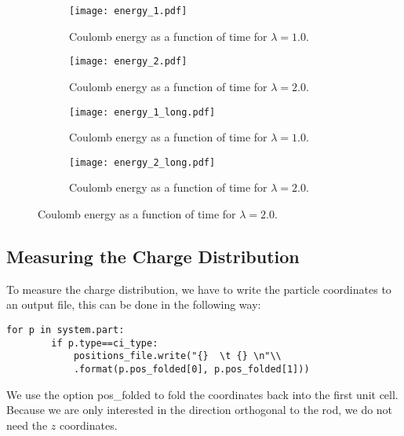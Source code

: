 \documentclass[a4paper,10pt,bibtotoc]{scrartcl}
\begin{document}
\begin{figure}[ht]
\begin{subfigure}{.5\textwidth}
  \centering
  \texttt{[image: energy\_1.pdf]}  
  \caption{Coulomb energy as a function of time for $\lambda=1.0$.}
  \label{equi1}
\end{subfigure}
\begin{subfigure}{.5\textwidth}
  \centering
  \texttt{[image: energy\_2.pdf]}  
  \caption{Coulomb energy as a function of time for $\lambda=2.0$.}
  \label{equi2}
\end{subfigure}
\begin{subfigure}{.5\textwidth}
  \centering
  \texttt{[image: energy\_1\_long.pdf]}  
  \caption{Coulomb energy as a function of time for $\lambda=1.0$.}
  \label{equi3}
\end{subfigure}
\begin{subfigure}{.5\textwidth}
  \centering
  \texttt{[image: energy\_2\_long.pdf]}  
  \caption{Coulomb energy as a function of time for $\lambda=2.0$.}
  \label{equi4}
\end{subfigure}
\label{fig:fig}
\end{figure}

\subsection{Measuring the Charge Distribution}
To measure the charge distribution, we have to write the particle coordinates to an output file, this can be done in the following way:
\begin{lstlisting}
for p in system.part:
        if p.type==ci_type:
            positions_file.write("{}  \t {} \n"\\
            .format(p.pos_folded[0], p.pos_folded[1]))
\end{lstlisting}
We use the option pos\_folded to fold the coordinates back into the first unit cell. 
Because we are only interested in the direction orthogonal to the rod, we do not need the $z$ coordinates.
\end{document}
